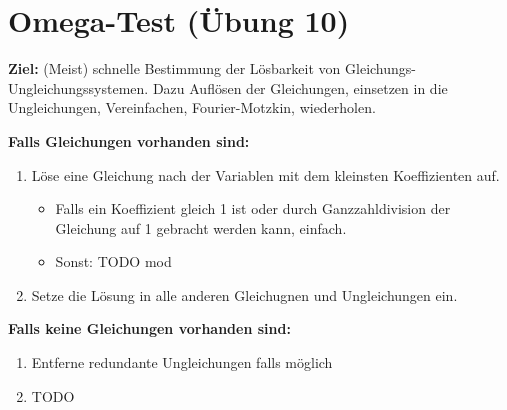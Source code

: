 \documentclass[a4paper,10pt]{article}
\begin{document}
\section{Omega-Test (Übung 10)}

\textbf{Ziel:} (Meist) schnelle Bestimmung der Lösbarkeit von Gleichungs-Ungleichungssystemen. Dazu Auflösen der Gleichungen, einsetzen in die Ungleichungen, Vereinfachen, Fourier-Motzkin, wiederholen.

\textbf{Falls Gleichungen vorhanden sind:}
\begin{enumerate}
    \item Löse eine Gleichung nach der Variablen mit dem kleinsten Koeffizienten auf.
        \begin{itemize}
            \item Falls ein Koeffizient gleich 1 ist oder durch Ganzzahldivision der Gleichung auf 1 gebracht werden kann, einfach.
            \item Sonst: TODO mod
        \end{itemize}
    \item Setze die Lösung in alle anderen Gleichugnen und Ungleichungen ein.
\end{enumerate}

\textbf{Falls keine Gleichungen vorhanden sind:}
\begin{enumerate}
    \item Entferne redundante Ungleichungen falls möglich
    \item TODO
\end{enumerate}
\end{document}
